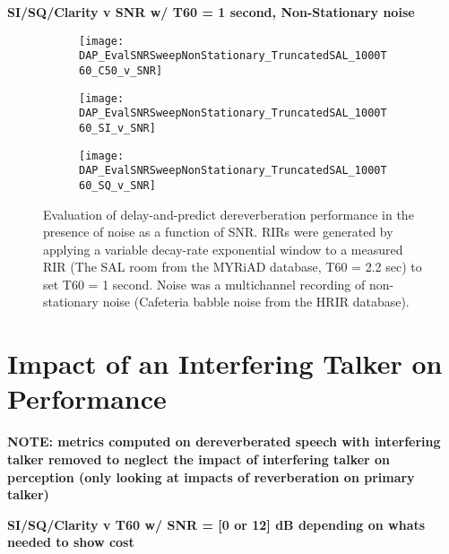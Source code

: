 \textbf{SI/SQ/Clarity v SNR w/ T60 = 1 second, Non-Stationary noise}

\begin{figure}[H]
	\centering
	\begin{subfigure}[b]{0.47\textwidth}
		\centering
		\texttt{[image: DAP\_EvalSNRSweepNonStationary\_TruncatedSAL\_1000T60\_C50\_v\_SNR]}
	\end{subfigure}
	\begin{subfigure}[b]{0.92\textwidth}
		\centering
		\texttt{[image: DAP\_EvalSNRSweepNonStationary\_TruncatedSAL\_1000T60\_SI\_v\_SNR]}
	\end{subfigure}
	\begin{subfigure}[b]{0.92\textwidth}
		\centering
		\texttt{[image: DAP\_EvalSNRSweepNonStationary\_TruncatedSAL\_1000T60\_SQ\_v\_SNR]}
	\end{subfigure}
	\caption{Evaluation of delay-and-predict dereverberation performance in the presence of noise as a function of SNR. RIRs were generated by applying a variable decay-rate exponential window to a measured RIR (The SAL room from the MYRiAD database, T60 = 2.2 sec) to set T60 = 1 second. Noise was a multichannel recording of non-stationary noise (Cafeteria babble noise from the HRIR database).}
	\label{fig:DAP_EvalSNRSweepNonStationary_TruncatedSAL_1000T60}
\end{figure}
\section{Impact of an Interfering Talker on Performance}

\textbf{NOTE: metrics computed on dereverberated speech with interfering talker removed to  neglect the impact of interfering talker on perception (only looking at impacts of reverberation on primary talker)}

\textbf{SI/SQ/Clarity v T60 w/ SNR = [0 or 12] dB depending on whats needed to show cost}


